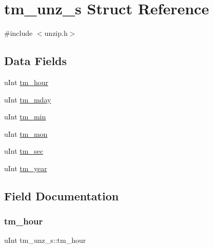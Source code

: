 \hypertarget{structtm__unz__s}{}\section{tm\+\_\+unz\+\_\+s Struct Reference}
\label{structtm__unz__s}


{\ttfamily \#include $<$unzip.\+h$>$}

\subsection*{Data Fields}
\begin{DoxyCompactItemize}
\item 
u\+Int \hyperlink{structtm__unz__s_ada09255f794d6c2db07ef73b77266b9c}{tm\+\_\+hour}
\item 
u\+Int \hyperlink{structtm__unz__s_a51ed1873e1dcabf08ff0f85caf8aefee}{tm\+\_\+mday}
\item 
u\+Int \hyperlink{structtm__unz__s_ac5a6bf08a4c5db8ae2243d4f0c35b192}{tm\+\_\+min}
\item 
u\+Int \hyperlink{structtm__unz__s_a4f5e461d8cad18d1aff7ec012168111d}{tm\+\_\+mon}
\item 
u\+Int \hyperlink{structtm__unz__s_ab91e69a9869e5db5be51b1aebaa5ea0d}{tm\+\_\+sec}
\item 
u\+Int \hyperlink{structtm__unz__s_a5f17147e3cfbbfdbeb2e29cbc1df8136}{tm\+\_\+year}
\end{DoxyCompactItemize}


\subsection{Field Documentation}
\mbox{\label{structtm__unz__s_ada09255f794d6c2db07ef73b77266b9c}} 
\subsubsection{\texorpdfstring{tm\+\_\+hour}{tm\_hour}}
{\footnotesize\ttfamily u\+Int tm\+\_\+unz\+\_\+s\+::tm\+\_\+hour}

\mbox{\label{structtm__unz__s_a51ed1873e1dcabf08ff0f85caf8aefee}} 
